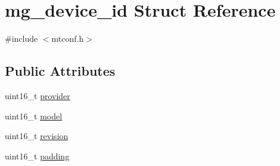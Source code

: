 \hypertarget{structmg__device__id}{\section{mg\+\_\+device\+\_\+id Struct Reference}
\label{structmg__device__id}
}


{\ttfamily \#include $<$mtconf.\+h$>$}

\subsection*{Public Attributes}
\begin{DoxyCompactItemize}
\item 
uint16\+\_\+t \hyperlink{structmg__device__id_a997dddde7b25e362be47970c28d79467}{provider}
\item 
uint16\+\_\+t \hyperlink{structmg__device__id_a52bf2da2b7f45c77415071230b34e7c1}{model}
\item 
uint16\+\_\+t \hyperlink{structmg__device__id_a722e6b6cac11edc35978ace2c0c5b33a}{revision}
\item 
uint16\+\_\+t \hyperlink{structmg__device__id_a7a2594163d9efb7db1eaec6f8bf746bd}{padding}
\end{DoxyCompactItemize}


